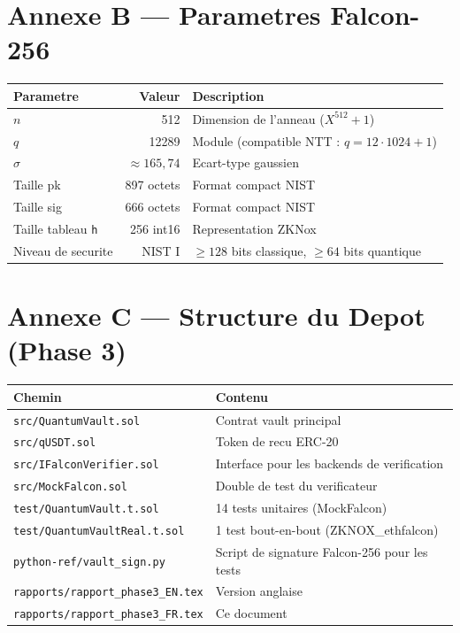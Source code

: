 \documentclass[11pt,a4paper]{article}
\begin{document}
\section{Annexe B --- Parametres Falcon-256}

\begin{center}
\begin{tabular}{lrl}
\toprule
\textbf{Parametre} & \textbf{Valeur} & \textbf{Description} \\
\midrule
$n$ & 512 & Dimension de l'anneau ($X^{512} + 1$) \\
$q$ & 12289 & Module (compatible NTT : $q = 12 \cdot 1024 + 1$) \\
$\sigma$ & $\approx 165,74$ & Ecart-type gaussien \\
Taille pk & 897 octets & Format compact NIST \\
Taille sig & 666 octets & Format compact NIST \\
Taille tableau \texttt{h} & 256 int16 & Representation ZKNox \\
Niveau de securite & NIST I & $\geq 128$ bits classique, $\geq 64$ bits quantique \\
\bottomrule
\end{tabular}
\end{center}

\section{Annexe C --- Structure du Depot (Phase 3)}

\begin{center}
\begin{tabular}{ll}
\toprule
\textbf{Chemin} & \textbf{Contenu} \\
\midrule
\texttt{src/QuantumVault.sol} & Contrat vault principal \\
\texttt{src/qUSDT.sol} & Token de recu ERC-20 \\
\texttt{src/IFalconVerifier.sol} & Interface pour les backends de verification \\
\texttt{src/MockFalcon.sol} & Double de test du verificateur \\
\texttt{test/QuantumVault.t.sol} & 14 tests unitaires (MockFalcon) \\
\texttt{test/QuantumVaultReal.t.sol} & 1 test bout-en-bout (ZKNOX\_ethfalcon) \\
\texttt{python-ref/vault\_sign.py} & Script de signature Falcon-256 pour les tests \\
\texttt{rapports/rapport\_phase3\_EN.tex} & Version anglaise \\
\texttt{rapports/rapport\_phase3\_FR.tex} & Ce document \\
\bottomrule
\end{tabular}
\end{center}

\end{document}
